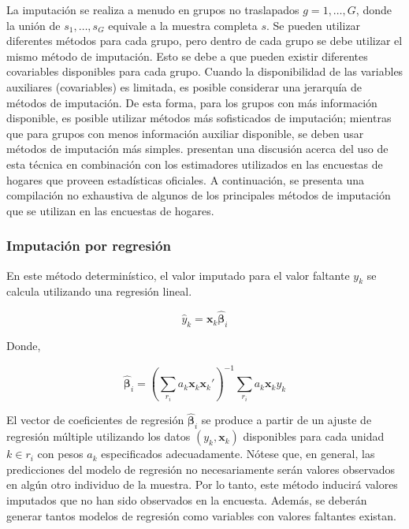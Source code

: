 \documentclass[
  10pt,
  spanish,
]{book}
\begin{document}
La imputación se realiza a menudo en grupos no traslapados \(g= 1, \ldots, G\), donde la unión de \(s_1, \ldots, s_G\) equivale a la muestra completa \(s\). Se pueden utilizar diferentes métodos para cada grupo, pero dentro de cada grupo se debe utilizar el mismo método de imputación. Esto se debe a que pueden existir diferentes covariables disponibles para cada grupo. Cuando la disponibilidad de las variables auxiliares (covariables) es limitada, es posible considerar una jerarquía de métodos de imputación. De esta forma, para los grupos con más información disponible, es posible utilizar métodos más sofisticados de imputación; mientras que para grupos con menos información auxiliar disponible, se deben usar métodos de imputación más simples. \citet{Sarndal_Lundstrom_2006} presentan una discusión acerca del uso de esta técnica en combinación con los estimadores utilizados en las encuestas de hogares que proveen estadísticas oficiales. A continuación, se presenta una compilación no exhaustiva de algunos de los principales métodos de imputación que se utilizan en las encuestas de hogares.

\hypertarget{imputaciuxf3n-por-regresiuxf3n}{%
\subsubsection*{Imputación por regresión}\label{imputaciuxf3n-por-regresiuxf3n}}

En este método determinístico, el valor imputado para el valor faltante \(y_k\) se calcula utilizando una regresión lineal.

\[
\hat{y}_k = \mathbf{x}_k \hat{\boldsymbol{\beta}}_i
\]

Donde,

\[
\hat{\boldsymbol{\beta}}_i = (\sum_{r_i} a_k\mathbf{x}_k\mathbf{x}_k')^{-1}
\sum_{r_i} a_k\mathbf{x}_ky_k
\]

El vector de coeficientes de regresión \(\hat{\boldsymbol{\beta}}_i\) se produce a partir de un ajuste de regresión múltiple utilizando los datos \((y_k, \mathbf{x}_k)\) disponibles para cada unidad \(k \in r_i\) con pesos \(a_k\) especificados adecuadamente. Nótese que, en general, las predicciones del modelo de regresión no necesariamente serán valores observados en algún otro individuo de la muestra. Por lo tanto, este método inducirá valores imputados que no han sido observados en la encuesta. Además, se deberán generar tantos modelos de regresión como variables con valores faltantes existan.
\end{document}
